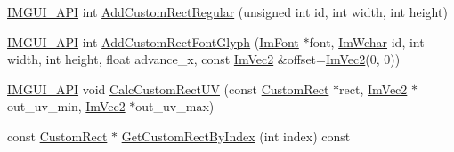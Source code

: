 \begin{DoxyCompactItemize}
\mbox{\hyperlink{imgui_8h_a43829975e84e45d1149597467a14bbf5}{I\+M\+G\+U\+I\+\_\+\+A\+PI}} int \mbox{\hyperlink{struct_im_font_atlas_ac51952803d2205f28ca9fc996c5f6243}{Add\+Custom\+Rect\+Regular}} (unsigned int id, int width, int height)
\item 
\mbox{\hyperlink{imgui_8h_a43829975e84e45d1149597467a14bbf5}{I\+M\+G\+U\+I\+\_\+\+A\+PI}} int \mbox{\hyperlink{struct_im_font_atlas_a5643182be4e3f1a442cfa6cdc0321c7c}{Add\+Custom\+Rect\+Font\+Glyph}} (\mbox{\hyperlink{struct_im_font}{Im\+Font}} $\ast$font, \mbox{\hyperlink{imgui_8h_af2c7badaf05a0008e15ef76d40875e97}{Im\+Wchar}} id, int width, int height, float advance\+\_\+x, const \mbox{\hyperlink{struct_im_vec2}{Im\+Vec2}} \&offset=\mbox{\hyperlink{struct_im_vec2}{Im\+Vec2}}(0, 0))
\item 
\mbox{\hyperlink{imgui_8h_a43829975e84e45d1149597467a14bbf5}{I\+M\+G\+U\+I\+\_\+\+A\+PI}} void \mbox{\hyperlink{struct_im_font_atlas_a70e062104b11a213eb3d177151c418e2}{Calc\+Custom\+Rect\+UV}} (const \mbox{\hyperlink{struct_im_font_atlas_1_1_custom_rect}{Custom\+Rect}} $\ast$rect, \mbox{\hyperlink{struct_im_vec2}{Im\+Vec2}} $\ast$out\+\_\+uv\+\_\+min, \mbox{\hyperlink{struct_im_vec2}{Im\+Vec2}} $\ast$out\+\_\+uv\+\_\+max)
\item 
const \mbox{\hyperlink{struct_im_font_atlas_1_1_custom_rect}{Custom\+Rect}} $\ast$ \mbox{\hyperlink{struct_im_font_atlas_a4d4403e920f1d93307936781050b52ee}{Get\+Custom\+Rect\+By\+Index}} (int index) const
\end{DoxyCompactItemize}
